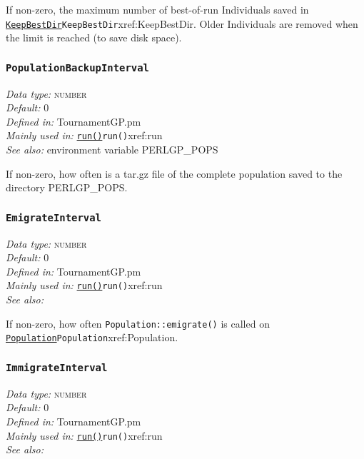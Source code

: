 \documentclass[a4paper]{article}
\begin{document}
If non-zero, the maximum number of best-of-run Individuals saved in
\hyperref[no]{\texttt{KeepBestDir}}{\texttt{KeepBestDir}}{xref:KeepBestDir}.  Older Individuals are removed when the limit is
reached (to save disk space).

\subsubsection{\texttt{PopulationBackupInterval}}\label{xref:PopulationBackupInterval}
\begin{flushleft}
\textit{Data type:} \textsc{number}\\
\textit{Default:} 0\\
\textit{Defined in:} TournamentGP.pm\\
\textit{Mainly used in:} \hyperref[no]{\texttt{run()}}{\texttt{run()}}{xref:run}\\
\textit{See also:} environment variable PERLGP\_POPS
\end{flushleft}

If non-zero, how often is a tar.gz file of the complete population
saved to the directory PERLGP\_POPS.

\subsubsection{\texttt{EmigrateInterval}}\label{xref:EmigrateInterval}
\begin{flushleft}
\textit{Data type:} \textsc{number}\\
\textit{Default:} 0\\
\textit{Defined in:} TournamentGP.pm\\
\textit{Mainly used in:} \hyperref[no]{\texttt{run()}}{\texttt{run()}}{xref:run}\\
\textit{See also:}
\end{flushleft}

If non-zero, how often \texttt{Population::emigrate()}
is called on \hyperref[no]{\texttt{Population}}{\texttt{Population}}{xref:Population}.

\subsubsection{\texttt{ImmigrateInterval}}\label{xref:ImmigrateInterval}
\begin{flushleft}
\textit{Data type:} \textsc{number}\\
\textit{Default:} 0\\
\textit{Defined in:} TournamentGP.pm\\
\textit{Mainly used in:} \hyperref[no]{\texttt{run()}}{\texttt{run()}}{xref:run}\\
\textit{See also:}
\end{flushleft}
\end{document}
